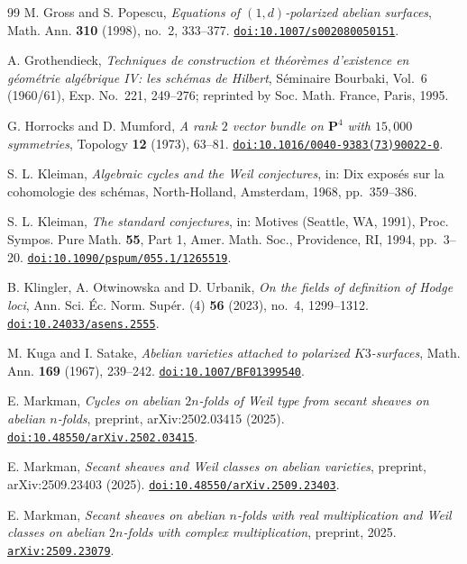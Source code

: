 \documentclass[11pt,reqno]{amsart}
\theoremstyle{plain}
\theoremstyle{definition}
\theoremstyle{remark}
\begin{document}
\begin{thebibliography}{99}
M. Gross and S. Popescu,
\emph{Equations of $(1,d)$-polarized abelian surfaces},
Math. Ann. \textbf{310} (1998), no.~2, 333--377.
\href{https://doi.org/10.1007/s002080050151}{\texttt{doi:10.1007/s002080050151}}.

A. Grothendieck,
\emph{Techniques de construction et th\'eor\`emes d'existence en g\'eom\'etrie
alg\'ebrique IV: les sch\'emas de Hilbert},
S\'eminaire Bourbaki, Vol.~6 (1960/61), Exp. No.~221, 249--276;
reprinted by Soc. Math. France, Paris, 1995.

G. Horrocks and D. Mumford,
\emph{A rank $2$ vector bundle on $\mathbf{P}^{4}$ with $15{,}000$ symmetries},
Topology \textbf{12} (1973), 63--81.
\href{https://doi.org/10.1016/0040-9383(73)90022-0}{\texttt{doi:10.1016/0040-9383(73)90022-0}}.

S. L. Kleiman,
\emph{Algebraic cycles and the Weil conjectures},
in: Dix expos\'es sur la cohomologie des sch\'emas,
North-Holland, Amsterdam, 1968, pp.~359--386.

S. L. Kleiman,
\emph{The standard conjectures},
in: Motives (Seattle, WA, 1991),
Proc. Sympos. Pure Math. \textbf{55}, Part 1,
Amer. Math. Soc., Providence, RI, 1994, pp.~3--20.
\href{https://doi.org/10.1090/pspum/055.1/1265519}{\texttt{doi:10.1090/pspum/055.1/1265519}}.

B. Klingler, A. Otwinowska and D. Urbanik,
\emph{On the fields of definition of Hodge loci},
Ann. Sci. \'Ec. Norm. Sup\'er. (4) \textbf{56} (2023), no.~4, 1299--1312.
\href{https://doi.org/10.24033/asens.2555}{\texttt{doi:10.24033/asens.2555}}.

M. Kuga and I. Satake,
\emph{Abelian varieties attached to polarized $K3$-surfaces},
Math. Ann. \textbf{169} (1967), 239--242.
\href{https://doi.org/10.1007/BF01399540}{\texttt{doi:10.1007/BF01399540}}.

E. Markman,
\emph{Cycles on abelian $2n$-folds of Weil type from secant sheaves on abelian
$n$-folds}, preprint, arXiv:2502.03415 (2025).
\href{https://doi.org/10.48550/arXiv.2502.03415}{\texttt{doi:10.48550/arXiv.2502.03415}}.

E. Markman,
\emph{Secant sheaves and Weil classes on abelian varieties},
preprint, arXiv:2509.23403 (2025).
\href{https://doi.org/10.48550/arXiv.2509.23403}{\texttt{doi:10.48550/arXiv.2509.23403}}.

E. Markman,
\emph{Secant sheaves on abelian $n$-folds with real multiplication and Weil
classes on abelian $2n$-folds with complex multiplication},
preprint, 2025.
\href{https://arxiv.org/abs/2509.23079}{\texttt{arXiv:2509.23079}}.


\end{thebibliography}
\end{document}
